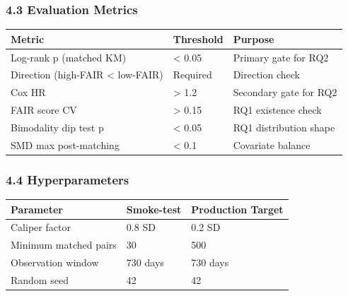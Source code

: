 \subsubsection{4.3 Evaluation Metrics}

\begin{table}[htbp]
\centering
\begin{tabular}{lll}
\toprule
Metric & Threshold & Purpose \\
\midrule
Log-rank p (matched KM) & < 0.05 & Primary gate for RQ2 \\
Direction (high-FAIR < low-FAIR) & Required & Direction check \\
Cox HR & > 1.2 & Secondary gate for RQ2 \\
FAIR score CV & > 0.15 & RQ1 existence check \\
Bimodality dip test p & < 0.05 & RQ1 distribution shape \\
SMD max post-matching & < 0.1 & Covariate balance \\
\bottomrule
\end{tabular}
\end{table}

\subsubsection{4.4 Hyperparameters}

\begin{table}[htbp]
\centering
\begin{tabular}{lll}
\toprule
Parameter & Smoke-test & Production Target \\
\midrule
Caliper factor & 0.8 SD & 0.2 SD \\
Minimum matched pairs & 30 & 500 \\
Observation window & 730 days & 730 days \\
Random seed & 42 & 42 \\
\bottomrule
\end{tabular}
\end{table}

